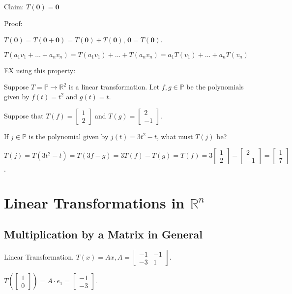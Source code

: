 \documentclass{package/notes}
\begin{document}
Claim: $T(\boldsymbol{0})=\boldsymbol{0}$

Proof: 

$T(\boldsymbol{0})=T(\boldsymbol{0}+\boldsymbol{0})=T(\boldsymbol{0})+T(\boldsymbol{0})$, $\boldsymbol{0}=T(\boldsymbol{0})$.

$T(a_1v_1+\dots +a_nv_n)=T(a_1v_1)+\dots +T(a_nv_n)=a_1T(v_1)+\dots +a_nT(v_n)$



EX using this property:

Suppose $T=\mathbb{P}\rightarrow \mathbb{R}^2$ is a linear transformation. Let $f,g\in \mathbb{P}$ be the polynomials given by $f(t)=t^2$ and $g(t)=t$.

Suppose that $T(f)=\left[\begin{array}{c} 1 \\ 2 \end{array} \right]$ and $T(g) = \left[\begin{array}{c} 2 \\ -1 \end{array} \right]$.

If $j\in \mathbb{P}$ is the polynomial given by $j(t)=3t^2-t$, what must $T(j)$ be?

$T(j)=T(3t^2-t)=T(3f-g)=3T(f)-T(g)=T(f)=3\left[\begin{array}{c} 1 \\ 2 \end{array} \right]-\left[\begin{array}{c} 2 \\ -1 \end{array} \right]=\left[\begin{array}{c} 1 \\ 7 \end{array} \right]$.

\section{Linear Transformations in $\mathbb{R}^n$}
\subsection{Multiplication by a Matrix in General}
Linear Transformation. $T(x)=Ax, A=\left[\begin{array}{cc} -1 & -1\\-3 & 1 \end{array} \right]$.

$T(\left[\begin{array}{c} 1\\0 \end{array} \right])=A\cdot e_1=\left[\begin{array}{c} -1\\-3 \end{array} \right]$.
\end{document}
